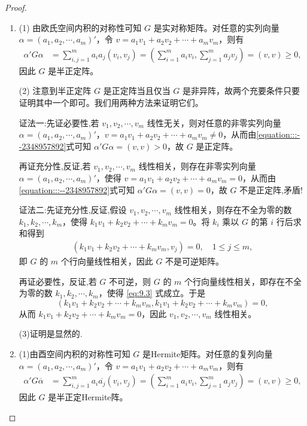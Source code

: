 \documentclass[../../main.tex]{subfiles}%
\begin{document}
\begin{proof}
\begin{enumerate}
\item (1) 由欧氏空间内积的对称性可知 $G$ 是实对称矩阵。对任意的实列向量 $\alpha=(a_1,a_2,\cdots,a_m)'$，令 $v = a_1v_1 + a_2v_2 + \cdots + a_mv_m$，则有
\begin{align}\label{equation:::--2348957892}
\alpha'G\alpha&=\sum_{i,j = 1}^{m}a_ia_j(v_i,v_j)=(\sum_{i = 1}^{m}a_iv_i,\sum_{j = 1}^{m}a_jv_j)=(v,v)\geqslant 0,
\end{align}
因此 $G$ 是半正定阵。

(2) 注意到半正定阵 $G$ 是正定阵当且仅当 $G$ 是非异阵，故两个充要条件只要证明其中一个即可。我们用两种方法来证明它们。

{\color{blue}证法一:}先证必要性,若 $v_1,v_2,\cdots,v_m$ 线性无关，则对任意的非零实列向量 $\alpha=(a_1,a_2,\cdots,a_m)'$，$v = a_1v_1 + a_2v_2 + \cdots + a_mv_m\neq0$，从而由\eqref{equation:::--2348957892}式可知 $\alpha'G\alpha=(v,v)>0$，故 $G$ 是正定阵。

再证充分性,反证,若 $v_1,v_2,\cdots,v_m$ 线性相关，则存在非零实列向量 $\alpha=(a_1,a_2,\cdots,a_m)'$，使得 $v = a_1v_1 + a_2v_2 + \cdots + a_mv_m = 0$，从而由\eqref{equation:::--2348957892}式可知 $\alpha'G\alpha=(v,v)=0$，故 $G$ 不是正定阵,矛盾!

{\color{blue}证法二:}先证充分性,反证,假设 $v_1,v_2,\cdots,v_m$ 线性相关，则存在不全为零的数 $k_1,k_2,\cdots,k_m$，使得 $k_1v_1 + k_2v_2 + \cdots + k_mv_m = 0$。将 $k_i$ 乘以 $G$ 的第 $i$ 行后求和得到
\begin{align}
(k_1v_1 + k_2v_2 + \cdots + k_mv_m,v_j)=0,\quad 1\leqslant  j\leqslant  m,\label{eq:9.3}
\end{align}
即 $G$ 的 $m$ 个行向量线性相关，因此 $G$ 不是可逆矩阵。

再证必要性，反证,若 $G$ 不可逆，则 $G$ 的 $m$ 个行向量线性相关，即存在不全为零的数 $k_1,k_2,\cdots,k_m$，使得 \eqref{eq:9.3} 式成立。于是
\[
(k_1v_1 + k_2v_2 + \cdots + k_mv_m,k_1v_1 + k_2v_2 + \cdots + k_mv_m)=0,
\]
从而 $k_1v_1 + k_2v_2 + \cdots + k_mv_m = 0$，因此 $v_1,v_2,\cdots,v_m$ 线性相关。

(3)证明是显然的.

\item (1)由酉空间内积的对称性可知 $G$ 是Hermite矩阵。对任意的复列向量 $\alpha=(a_1,a_2,\cdots,a_m)'$，令 $v = a_1v_1 + a_2v_2 + \cdots + a_mv_m$，则有
\begin{align}\label{equation:::--234895789}
\alpha'G \overline{\alpha}&=\sum_{i,j = 1}^{m}a_i\overline{a_j}(v_i,v_j)=(\sum_{i = 1}^{m}a_iv_i,\sum_{j = 1}^{m}a_jv_j)=(v,v)\geqslant 0,
\end{align}
因此 $G$ 是半正定Hermite阵。


\end{enumerate}
\end{proof}
\end{document}
